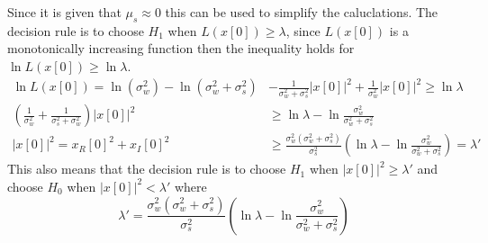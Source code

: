 Since it is given that $\mu_s \approx 0$ this can be used to simplify the caluclations. The decision rule is to choose $H_1$ when $L(x[0]) \geq \lambda$, since $L(x[0])$ is a monotonically increasing function then the inequality holds for $\ln L(x[0]) \geq \ln\lambda$.
\begin{align}
    \ln L(x[0]) = \ln (\sigma_w^2)-\ln (\sigma_w^2+\sigma_s^2) & -\frac{1}{\sigma_w^2+\sigma_s^2}|x[0]|^2 +\frac{1}{\sigma_w^2}|x[0]|^2 \geq \ln\lambda\nonumber\\
    \left(\frac{1}{\sigma_w^2}+\frac{1}{\sigma_s^2+\sigma_w^2}\right)|x[0]|^2 & \geq \ln\lambda-\ln \frac{\sigma_w^2}{\sigma_w^2+\sigma_s^2}\nonumber\\
    |x[0]|^2 = x_R[0]^2+x_I[0]^2 & \geq \frac{\sigma_w^2(\sigma_w^2+\sigma_s^2)}{\sigma_s^2}\left(\ln\lambda-\ln\frac{\sigma_w^2}{\sigma_w^2+\sigma_s^2}\right) = \lambda'\nonumber
\end{align}
This also means that the decision rule is to choose $H_1$ when $|x[0]|^2\geq\lambda'$ and choose $H_0$ when $|x[0]|^2<\lambda'$ where
\begin{equation}
    \lambda' = \frac{\sigma_w^2(\sigma_w^2+\sigma_s^2)}{\sigma_s^2}\left(\ln\lambda-\ln \frac{\sigma_w^2}{\sigma_w^2+\sigma_s^2}\right)
\end{equation}\label{eq:lambda_prime}

